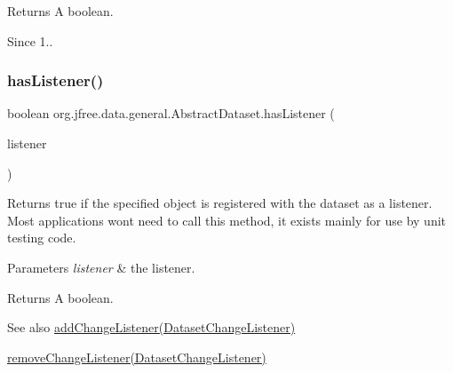 \begin{DoxyReturn}{Returns}
A boolean.
\end{DoxyReturn}
\begin{DoxySince}{Since}
1.. 
\end{DoxySince}
\mbox{\label{classorg_1_1jfree_1_1data_1_1general_1_1_abstract_dataset_a5e03b35046757be9ed9658322ab1872d}} 
\subsubsection{\texorpdfstring{has\+Listener()}{hasListener()}}
{\footnotesize\ttfamily boolean org.\+jfree.\+data.\+general.\+Abstract\+Dataset.\+has\+Listener (\begin{DoxyParamCaption}\item[{Event\+Listener}]{listener }\end{DoxyParamCaption})}

Returns {\ttfamily true} if the specified object is registered with the dataset as a listener. Most applications won\textquotesingle{}t need to call this method, it exists mainly for use by unit testing code.


\begin{DoxyParams}{Parameters}
{\em listener} & the listener.\\
\hline
\end{DoxyParams}
\begin{DoxyReturn}{Returns}
A boolean.
\end{DoxyReturn}
\begin{DoxySeeAlso}{See also}
\mbox{\hyperlink{classorg_1_1jfree_1_1data_1_1general_1_1_abstract_dataset_a98ccd0af41c59cd8fe50543376d0faf9}{add\+Change\+Listener(\+Dataset\+Change\+Listener)}} 

\mbox{\hyperlink{classorg_1_1jfree_1_1data_1_1general_1_1_abstract_dataset_ab0a2ba36de45585c70212701459b5979}{remove\+Change\+Listener(\+Dataset\+Change\+Listener)}} 
\end{DoxySeeAlso}
\mbox{\label{classorg_1_1jfree_1_1data_1_1general_1_1_abstract_dataset_a96514c405bb2dd442ae9e363af6e8876}} 
